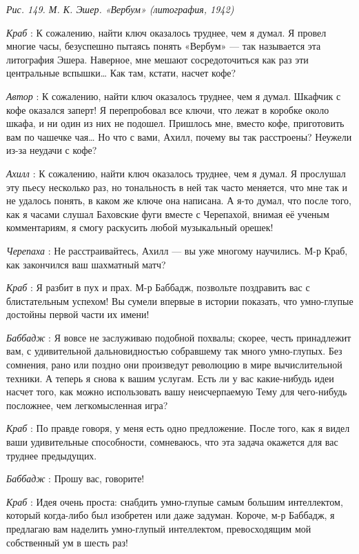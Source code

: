 \documentclass[../main.tex]{subfiles}
\begin{document}
\begin{dialogue}
\emph{Рис. 149. М. К. Эшер. «Вербум» (литография, 1942)}

\emph{Краб} : К сожалению, найти ключ оказалось труднее, чем я думал. Я провел многие часы, безуспешно пытаясь понять «Вербум» --- так называется эта литография Эшера. Наверное, мне мешают сосредоточиться как раз эти центральные вспышки\ldots{} Как там, кстати, насчет кофе?

\emph{Автор} : К сожалению, найти ключ оказалось труднее, чем я думал. Шкафчик с кофе оказался заперт! Я перепробовал все ключи, что лежат в коробке около шкафа, и ни один из них не подошел. Пришлось мне, вместо кофе, приготовить вам по чашечке чая\ldots{} Но что с вами, Ахилл, почему вы так расстроены? Неужели из-за неудачи с кофе?

\emph{Ахилл} : К сожалению, найти ключ оказалось труднее, чем я думал. Я прослушал эту пьесу несколько раз, но тональность в ней так часто меняется, что мне так и не удалось понять, в каком же ключе она написана. А я-то думал, что после того, как я часами слушал Баховские фуги вместе с Черепахой, внимая её ученым комментариям, я смогу раскусить любой музыкальный орешек!

\emph{Черепаха} : Не расстраивайтесь, Ахилл --- вы уже многому научились. М-р Краб, как закончился ваш шахматный матч?

\emph{Краб} : Я разбит в пух и прах. М-р Баббадж, позвольте поздравить вас с блистательным успехом! Вы сумели впервые в истории показать, что умно-глупые достойны первой части их имени!

\emph{Баббадж} : Я вовсе не заслуживаю подобной похвалы; скорее, честь принадлежит вам, с удивительной дальновидностью собравшему так много умно-глупых. Без сомнения, рано или поздно они произведут революцию в мире вычислительной техники. А теперь я снова к вашим услугам. Есть ли у вас какие-нибудь идеи насчет того, как можно использовать вашу неисчерпаемую Тему для чего-нибудь посложнее, чем легкомысленная игра?

\emph{Краб} : По правде говоря, у меня есть одно предложение. После того, как я видел ваши удивительные способности, сомневаюсь, что эта задача окажется для вас труднее предыдущих.

\emph{Баббадж} : Прошу вас, говорите!

\emph{Краб} : Идея очень проста: снабдить умно-глупые самым большим интеллектом, который когда-либо был изобретен или даже задуман. Короче, м-р Баббадж, я предлагаю вам наделить умно-глупый интеллектом, превосходящим мой собственный ум в шесть раз!


\end{dialogue}
\end{document}
